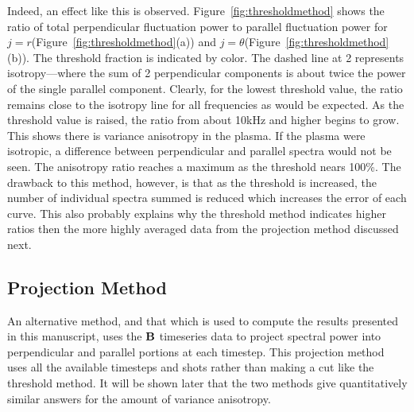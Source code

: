 \documentclass[preprint2]{aastex}
\begin{document}
Indeed, an effect like this is observed. Figure~\ref{fig:thresholdmethod} shows the ratio of total perpendicular fluctuation power to parallel fluctuation power for $j = r$(Figure~\ref{fig:thresholdmethod}(a)) and $j = \theta$(Figure~\ref{fig:thresholdmethod}(b)). The threshold fraction is indicated by color. The dashed line at 2 represents isotropy---where the sum of 2 perpendicular components is about twice the power of the single parallel component. Clearly, for the lowest threshold value, the ratio remains close to the isotropy line for all frequencies as would be expected. As the threshold value is raised, the ratio from about 10kHz and higher begins to grow. This shows there is variance anisotropy in the plasma. If the plasma were isotropic, a difference between perpendicular and parallel spectra would not be seen. The anisotropy ratio reaches a maximum as the threshold nears 100\%. The drawback to this method, however, is that as the threshold is increased, the number of individual spectra summed is reduced which increases the error of each curve. This also probably explains why the threshold method indicates higher ratios then the more highly averaged data from the projection method discussed next.

\subsection{Projection Method}\label{sec:projection2}

An alternative method, and that which is used to compute the results presented in this manuscript, uses the ${\bf B}$ timeseries data to project spectral power into perpendicular and parallel portions at each timestep. This projection method uses all the available timesteps and shots rather than making a cut like the threshold method. It will be shown later that the two methods give quantitatively similar answers for the amount of variance anisotropy.
\end{document}
